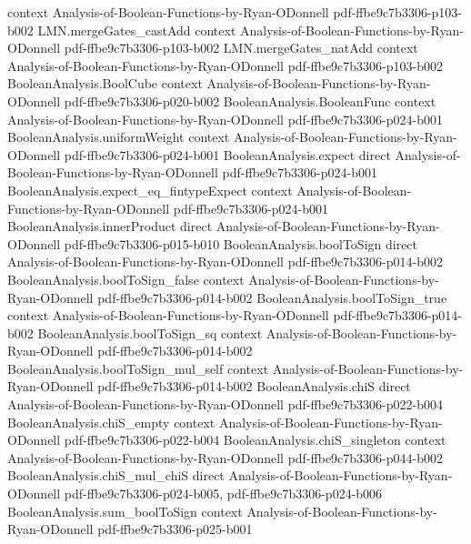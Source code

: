 \begin{theorem}
  {context}
  {Analysis-of-Boolean-Functions-by-Ryan-ODonnell}
  {pdf-ffbe9c7b3306-p103-b002}
\proofstep
  {LMN.mergeGates_castAdd}
  {context}
  {Analysis-of-Boolean-Functions-by-Ryan-ODonnell}
  {pdf-ffbe9c7b3306-p103-b002}
\proofstep
  {LMN.mergeGates_natAdd}
  {context}
  {Analysis-of-Boolean-Functions-by-Ryan-ODonnell}
  {pdf-ffbe9c7b3306-p103-b002}
\proofstep
  {BooleanAnalysis.BoolCube}
  {context}
  {Analysis-of-Boolean-Functions-by-Ryan-ODonnell}
  {pdf-ffbe9c7b3306-p020-b002}
\proofstep
  {BooleanAnalysis.BooleanFunc}
  {context}
  {Analysis-of-Boolean-Functions-by-Ryan-ODonnell}
  {pdf-ffbe9c7b3306-p024-b001}
\proofstep
  {BooleanAnalysis.uniformWeight}
  {context}
  {Analysis-of-Boolean-Functions-by-Ryan-ODonnell}
  {pdf-ffbe9c7b3306-p024-b001}
\proofstep
  {BooleanAnalysis.expect}
  {direct}
  {Analysis-of-Boolean-Functions-by-Ryan-ODonnell}
  {pdf-ffbe9c7b3306-p024-b001}
\proofstep
  {BooleanAnalysis.expect_eq_fintypeExpect}
  {context}
  {Analysis-of-Boolean-Functions-by-Ryan-ODonnell}
  {pdf-ffbe9c7b3306-p024-b001}
\proofstep
  {BooleanAnalysis.innerProduct}
  {direct}
  {Analysis-of-Boolean-Functions-by-Ryan-ODonnell}
  {pdf-ffbe9c7b3306-p015-b010}
\proofstep
  {BooleanAnalysis.boolToSign}
  {direct}
  {Analysis-of-Boolean-Functions-by-Ryan-ODonnell}
  {pdf-ffbe9c7b3306-p014-b002}
\proofstep
  {BooleanAnalysis.boolToSign_false}
  {context}
  {Analysis-of-Boolean-Functions-by-Ryan-ODonnell}
  {pdf-ffbe9c7b3306-p014-b002}
\proofstep
  {BooleanAnalysis.boolToSign_true}
  {context}
  {Analysis-of-Boolean-Functions-by-Ryan-ODonnell}
  {pdf-ffbe9c7b3306-p014-b002}
\proofstep
  {BooleanAnalysis.boolToSign_sq}
  {context}
  {Analysis-of-Boolean-Functions-by-Ryan-ODonnell}
  {pdf-ffbe9c7b3306-p014-b002}
\proofstep
  {BooleanAnalysis.boolToSign_mul_self}
  {context}
  {Analysis-of-Boolean-Functions-by-Ryan-ODonnell}
  {pdf-ffbe9c7b3306-p014-b002}
\proofstep
  {BooleanAnalysis.chiS}
  {direct}
  {Analysis-of-Boolean-Functions-by-Ryan-ODonnell}
  {pdf-ffbe9c7b3306-p022-b004}
\proofstep
  {BooleanAnalysis.chiS_empty}
  {context}
  {Analysis-of-Boolean-Functions-by-Ryan-ODonnell}
  {pdf-ffbe9c7b3306-p022-b004}
\proofstep
  {BooleanAnalysis.chiS_singleton}
  {context}
  {Analysis-of-Boolean-Functions-by-Ryan-ODonnell}
  {pdf-ffbe9c7b3306-p044-b002}
\proofstep
  {BooleanAnalysis.chiS_mul_chiS}
  {direct}
  {Analysis-of-Boolean-Functions-by-Ryan-ODonnell}
  {pdf-ffbe9c7b3306-p024-b005,
    pdf-ffbe9c7b3306-p024-b006}
\proofstep
  {BooleanAnalysis.sum_boolToSign}
  {context}
  {Analysis-of-Boolean-Functions-by-Ryan-ODonnell}
  {pdf-ffbe9c7b3306-p025-b001}

\end{theorem}
